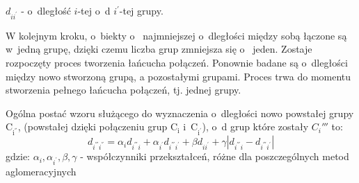 \documentclass[12pt,a4paper]{report}
\begin{document}
$d_{ii^{'}}$ - o~dległość $i$-tej o~d $i^{'}$-tej grupy.

W kolejnym kroku, o~biekty o~ najmniejszej o~dległości między sobą łączone są w~jedną grupę, dzięki czemu liczba grup zmniejsza się o~ jeden. Zostaje rozpoczęty proces tworzenia łańcucha połączeń. Ponownie badane są o~dległości między nowo stworzoną grupą, a pozostałymi grupami. Proces trwa do momentu stworzenia pełnego łańcucha połączeń, tj. jednej grupy. 


Ogólna postać wzoru służącego do wyznaczenia o~dległości nowo powstałej grupy $\mathrm{C_{i^{''}}}$, (powstałej dzięki połączeniu grup $\mathrm{C_{i}}$ i~$\mathrm{C_{i^{'}}}$), o~d grup które zostały ${C_i{'''}}$ to:
$$
d_{i^{'''}i^{''}}=\alpha_{i}d_{i^{'''}i} + \alpha_{i^{'}}d_{i^{'''}i^{'}} + \beta d_{ii^{'}} + \gamma|d_{i^{'''}i} - d_{i^{'''}i^{'}}| 
$$
gdzie:
$\alpha_{i},\alpha_{i^{'}}, \beta, \gamma$ - współczynniki przekształceń, różne dla poszczególnych metod aglomeracyjnych
\end{document}
